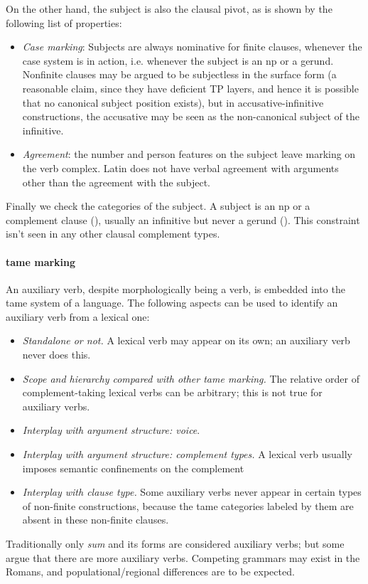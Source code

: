 \documentclass[a4paper, oneside, 12pt]{report}
\newcommand{\form}[1]{\emph{#1}}
\begin{document}
On the other hand, the subject is also the clausal pivot, as is shown by the following list of properties:
\begin{itemize}
    \item \emph{Case marking}: 
    Subjects are always nominative for finite clauses,
    whenever the case system is in action,
    i.e. whenever the subject is an \ac{np} or a gerund. 
    Nonfinite clauses may be argued to be subjectless in the surface form 
    (a reasonable claim, since they have deficient TP layers, 
    and hence it is possible that no canonical subject position exists),
    but in accusative-infinitive constructions, %
    the accusative may be seen as the non-canonical subject of the infinitive.
    \item \emph{Agreement}: 
    the number and person features on the subject leave marking on the verb complex.
    Latin does not have verbal agreement with arguments other than the agreement with the subject.
\end{itemize}

Finally we check the categories of the subject. A subject is an \ac{np}  
or a complement clause (), 
usually an infinitive but never a gerund ().
This constraint isn't seen in any other clausal complement types.

\paragraph*{\ac{tame} marking} 

An auxiliary verb, despite morphologically being a verb, 
is embedded into the \ac{tame} system of a language.
The following aspects can be used to identify 
an auxiliary verb from a lexical one:
\begin{itemize}
    \item \emph{Standalone or not.} A lexical verb may appear on its own;
    an auxiliary verb never does this.
    \item \emph{Scope and hierarchy compared with other \ac{tame} marking.} 
    The relative order of complement-taking lexical verbs can be arbitrary;
    this is not true for auxiliary verbs. 
    \item \emph{Interplay with argument structure: voice}.
    \item \emph{Interplay with argument structure: complement types.} 
    A lexical verb usually imposes semantic confinements on the complement 
    \item \emph{Interplay with clause type.} 
    Some auxiliary verbs never appear in certain types of non-finite constructions, 
    because the \ac{tame} categories labeled by them 
    are absent in these non-finite clauses.
\end{itemize}
Traditionally only \form{sum} and its forms are considered auxiliary verbs; 
but some argue that there are more auxiliary verbs.
Competing grammars may exist in the Romans, and populational/regional differences are to be expected.
\end{document}
